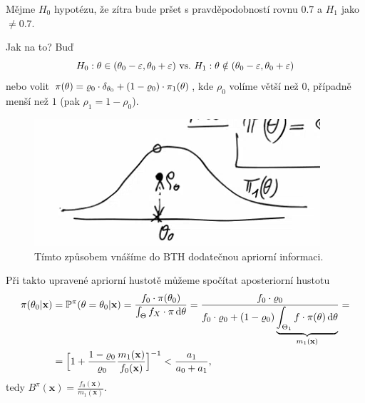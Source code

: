 \begin{example}
	Mějme $H_0$ hypotézu, že zítra bude pršet s pravděpodobností rovnu $0.7$ a $H_1$ jako $\neq 0.7$. 
	
	Jak na to? Buď $$H_0: \theta\in(\theta_0-\varepsilon,\theta_0+\varepsilon) ~\text{vs.}~ H_1: \theta\notin(\theta_0-\varepsilon,\theta_0+\varepsilon)$$
	nebo volit $\pi(\theta)=\varrho_0\cdot \delta_{\theta_0}+(1-\varrho_0)\cdot\pi_1(\theta)$, kde $\rho_0$ volíme větší než $0$, případně menší než $1$ (pak $\rho_1=1-\rho_0$).
	
	\begin{figure}[h]
		\centering
		\includegraphics[width=0.5\linewidth]{pictures/last1}
		\caption{Tímto způsobem vnášíme do BTH dodatečnou apriorní informaci.}
		\label{fig:last1}
	\end{figure}
	Při takto upravené apriorní hustotě můžeme spočítat aposteriorní hustotu
	\begin{align*}
\pi(\theta_0|\textbf{x})&=\mathbb{P}^\pi(\theta=\theta_0|\textbf{x})=\frac{f_0\cdot\pi(\theta_0)}{\int_\Theta f_X \cdot \pi\,\mathrm{d}\theta}=\frac{f_0\cdot\varrho_0}{f_0\cdot\varrho_0+(1-\varrho_0)\underbrace{\int_{\Theta_1}f\cdot\pi(\theta)\,\mathrm{d}\theta}_{m_1(\textbf{x})}}= \\ 
&=\Big[1+\frac{1-\varrho_0}{\varrho_0}\frac{m_1(\textbf{x})}{f_0(\textbf{x})}\Big]^{-1}<\frac{a_1}{a_0+a_1},
\end{align*}
tedy $B^\pi(\textbf{x})=\frac{f_0(\textbf{x})}{m_1(\textbf{x})}$.
\end{example}
